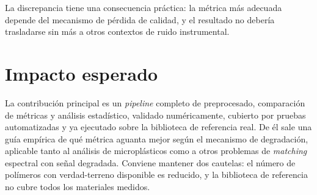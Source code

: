 La discrepancia tiene una consecuencia práctica: la métrica más adecuada depende del mecanismo de pérdida de calidad, y el resultado no debería trasladarse sin más a otros contextos de ruido instrumental.

\section{Impacto esperado}

La contribución principal es un \textit{pipeline} completo de preprocesado, comparación de métricas y análisis estadístico, validado numéricamente, cubierto por pruebas automatizadas y ya ejecutado sobre la biblioteca de referencia real. De él sale una guía empírica de qué métrica aguanta mejor según el mecanismo de degradación, aplicable tanto al análisis de microplásticos como a otros problemas de \textit{matching} espectral con señal degradada. Conviene mantener dos cautelas: el número de polímeros con verdad-terreno disponible es reducido, y la biblioteca de referencia no cubre todos los materiales medidos.
